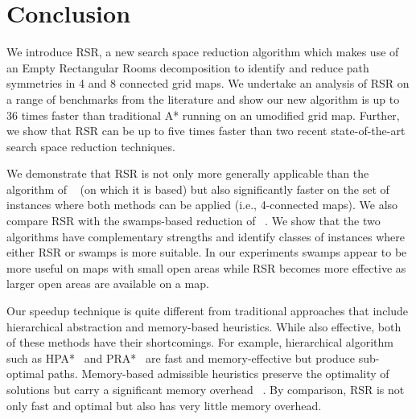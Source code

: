 \section{Conclusion}
We introduce RSR, a new search space reduction algorithm
which makes use of an Empty Rectangular Rooms decomposition
to identify and reduce path symmetries in 4 and 8 connected
grid maps.
We undertake an analysis of RSR on a range of benchmarks from the
literature and show our new algorithm is up to 36 times faster than
traditional A* running on an umodified grid map.
Further, we show that RSR can be up to five times faster than two recent
state-of-the-art search space reduction techniques.
\par
We demonstrate that RSR is not only more generally applicable
than the algorithm of \citeauthor{harabor10}~ 
(on which it is based) but also significantly faster on the set of 
instances where both methods can be applied (i.e., 4-connected maps).
We also compare RSR with the swamps-based reduction
of \citeauthor{pochter10}~.
We show that the two algorithms have complementary strengths and identify 
classes of instances where either RSR or swamps is more suitable.
In our experiments swamps appear to be more useful on maps with small open areas
while RSR becomes more effective as larger open areas are available on a map.
\par
Our speedup technique is quite different from traditional approaches 
that include hierarchical abstraction and memory-based heuristics.
While also effective, both of these methods have their shortcomings.
For example, hierarchical algorithm such as HPA*~\cite{botea04} and 
PRA*~\cite{sturtevant05} are fast and memory-effective but produce 
sub-optimal paths.
Memory-based admissible heuristics preserve the optimality of 
solutions but carry a significant memory overhead~
\cite{sturtevant09,goldberg05,Cazenave:06,bjornsson06}.
By comparison, RSR is not only fast and optimal but also has very little
memory overhead.



